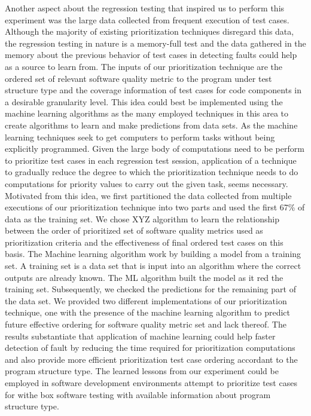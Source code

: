 \documentclass{sig-alternate}
\begin{document}
Another aspect about the regression testing that inspired us to perform this experiment was the large data collected from frequent execution of test cases. Although the majority of existing prioritization techniques disregard this data, the regression testing in nature is a memory-full test and the data gathered in the memory about the previous behavior of test cases in detecting faults could help as a source to learn from. The inputs of our prioritization technique are the ordered set of relevant software quality metric to the program under test structure type and the coverage information of test cases for code components in a desirable granularity level. This idea could best be implemented using the machine learning algorithms as the many employed techniques in this area to create algorithms to learn and make predictions from data sets. As the machine learning techniques seek to get computers to perform tasks without being explicitly programmed. Given the large body of computations need to be perform to prioritize test cases in each regression test session, application of a technique to gradually reduce the degree to which the prioritization technique needs to do computations for priority values to carry out the given task, seems necessary. Motivated from this idea, we first partitioned the data collected from multiple executions of our prioritization technique into two parts and used the first 67\% of data as the training set. We chose XYZ algorithm to learn the relationship between the order of prioritized set of software quality metrics used as prioritization criteria and the effectiveness of final ordered test cases on this basis. The Machine learning algorithm work by building a model from a training set. A training set is a data set that is input into an algorithm where the correct outputs are already known. The ML algorithm built the model as it red the training set. Subsequently, we checked the predictions for the remaining part of the data set. We provided two different implementations of our prioritization technique, one with the presence of the machine learning algorithm to predict future effective ordering for software quality metric set and lack thereof. The results substantiate that application of machine learning could help faster detection of fault by reducing the time required for prioritization computations and also provide more efficient prioritization test case ordering accordant to the program structure type. The learned lessons from our experiment could be employed in software development environments attempt to prioritize test cases for withe box software testing with available information about program structure type.  
\end{document}
